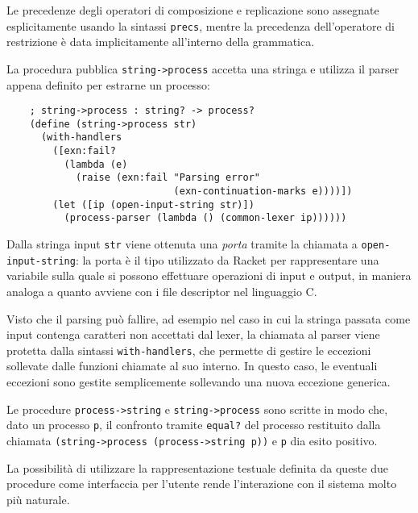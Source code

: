 Le precedenze degli operatori di composizione e replicazione sono
assegnate esplicitamente usando la sintassi \lstinline{precs}, mentre
la precedenza dell'operatore di restrizione \`e data implicitamente
all'interno della grammatica.

La procedura pubblica \lstinline{string->process} accetta una stringa
e utilizza il parser appena definito per estrarne un processo:

\begin{lstlisting}
    ; string->process : string? -> process?
    (define (string->process str)
      (with-handlers
        ([exn:fail?
          (lambda (e)
            (raise (exn:fail "Parsing error"
                             (exn-continuation-marks e))))])
        (let ([ip (open-input-string str)])
          (process-parser (lambda () (common-lexer ip))))))
\end{lstlisting}

Dalla stringa input \lstinline{str} viene ottenuta una \emph{porta}
tramite la chiamata a \lstinline{open-input-string}: la porta \`e il
tipo utilizzato da Racket per rappresentare una variabile sulla
quale si possono effettuare operazioni di input e output, in maniera
analoga a quanto avviene con i file descriptor nel linguaggio C.

Visto che il parsing pu\`o fallire, ad esempio nel caso in cui la
stringa passata come input contenga caratteri non accettati dal lexer,
la chiamata al parser viene protetta dalla sintassi
\lstinline{with-handlers}, che permette di gestire le eccezioni
sollevate dalle funzioni chiamate al suo interno. In questo caso,
le eventuali eccezioni sono gestite semplicemente sollevando una
nuova eccezione generica.

Le procedure \lstinline{process->string} e \lstinline{string->process}
sono scritte in modo che, dato un processo \lstinline{p}, il confronto
tramite \lstinline{equal?} del processo restituito dalla chiamata
\lstinline{(string->process (process->string p))} e \lstinline{p} dia
esito positivo.

La possibilit\`a di utilizzare la rappresentazione testuale definita
da queste due procedure come interfaccia per l'utente rende
l'interazione con il sistema molto pi\`u naturale.
